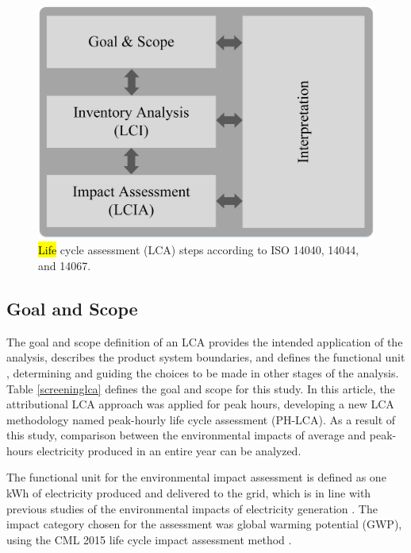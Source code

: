 \begin{figure}[]
	\centering
	\includegraphics[width=0.4\columnwidth ]{ChapterLCA/Images/LCA_Framework_v3.jpg}
		\caption{\hl{Life} cycle assessment (LCA) steps according to ISO 14040, 14044, and 14067.}
	\label{LCA_Methodology}  %
\end{figure}


{\subsection {Goal and Scope} \label{goalscope}}
{The goal and scope definition of an LCA provides the intended application of the analysis, describes the product system boundaries, and defines the functional unit \cite{REBITZER2004701}, determining and guiding the choices to be made in other stages of the analysis. Table \ref{screeninglca} defines the goal and scope for this study.} {In this article, the attributional LCA approach was applied for peak hours, developing a new LCA methodology named peak-hourly life cycle assessment (PH-LCA). As a result of this study, comparison between the environmental impacts of average and peak-hours  electricity produced in an entire year can be analyzed.} 

{The functional unit for the environmental impact assessment is defined as one kWh of electricity produced and delivered to the grid, which is in line with previous studies of the environmental impacts of electricity generation \cite{Nilsson2017AssessingEmissions, Khan2018, Khan2018AnalysisIntensity, MESSAGIE2014469, Cubi2015IncorporationAssessment, Buyle2019}. The impact category chosen for the assessment was global warming potential (GWP), using the CML 2015 life cycle impact assessment method \cite{Guinee2001}.} 


